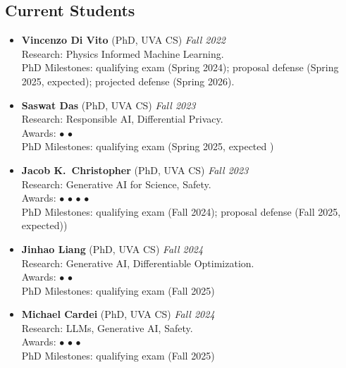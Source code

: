 \medskip

\subsection*{Current Students}
\begin{itemize}

  \item \textbf{Vincenzo Di Vito} (PhD, {\sc UVA} CS)
  \hfill{\em Fall 2022}\\
  {\sc Research:} Physics Informed Machine Learning.\\
  {\sc PhD Milestones:} qualifying exam (Spring 2024); proposal defense (Spring 2025, expected); projected defense (Spring 2026).
  
  \item \textbf{Saswat Das} (PhD, {\sc UVA} CS)
  \hfill{\em Fall 2023}\\
  {\sc Research:} Responsible AI, Differential Privacy.\\
  {\sc Awards:} 
  $\bullet$ 
  $\bullet$ \\
  {\sc PhD Milestones:} qualifying exam (Spring 2025, expected )

  \item \textbf{Jacob K.~Christopher} (PhD, {\sc UVA} CS)
  \hfill{\em Fall 2023}\\
  {\sc Research:} Generative AI for Science, Safety.\\
  {\sc Awards:} 
  $\bullet$ 
  $\bullet$  
  $\bullet$ 
  $\bullet$ \\
  {\sc PhD Milestones:} qualifying exam (Fall 2024); proposal defense (Fall 2025, expected))

  \item \textbf{Jinhao Liang} (PhD, {\sc UVA} CS)
  \hfill{\em Fall 2024}\\
  {\sc Research:} Generative AI, Differentiable Optimization.\\
  {\sc Awards:} 
  $\bullet$ 
  $\bullet$ \\
  {\sc PhD Milestones:} qualifying exam (Fall 2025)
  
  \item \textbf{Michael Cardei} (PhD, {\sc UVA} CS)
  \hfill{\em Fall 2024}\\
  {\sc Research:} LLMs, Generative AI, Safety.\\
  {\sc Awards:} 
  $\bullet$ 
  $\bullet$ 
  $\bullet$ \\
  {\sc PhD Milestones:} qualifying exam (Fall 2025)


\end{itemize}
